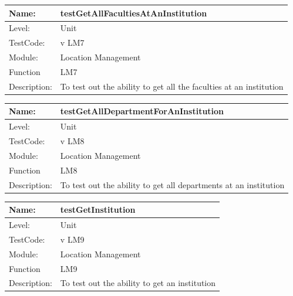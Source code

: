 \documentclass[12pt]{article}
\begin{document}
\begin{flushleft}
\begin{center}
\begin{tabular}{|l|p{12cm}|}
\hline

 Name: & testGetAllFacultiesAtAnInstitution \\
 \hline
Level: & Unit \\
\hline
TestCode: & v LM7 \\
\hline
Module:& Location Management \\
\hline
Function & LM7 \\
\hline
Description: & To test out the ability to get all the faculties at an institution  \\
\hline
\end{tabular}
\end{center}

\begin{center}
\begin{tabular}{|l|p{12cm}|}
\hline

 Name: & testGetAllDepartmentForAnInstitution \\
 \hline
Level: & Unit \\
\hline
TestCode: & v LM8 \\
\hline
Module:& Location Management \\
\hline
Function & LM8 \\
\hline
Description: & To test out the ability to get all departments at an institution  \\
\hline
\end{tabular}
\end{center}

\begin{center}
\begin{tabular}{|l|p{12cm}|}
\hline

 Name: & testGetInstitution \\
 \hline
Level: & Unit \\
\hline
TestCode: & v LM9 \\
\hline
Module:& Location Management \\
\hline
Function & LM9 \\
\hline
Description: & To test out the ability to get an institution  \\
\hline
\end{tabular}
\end{center}

\begin{center}
\begin{tabular}{|l|p{12cm}|}
\hline


\end{tabular}
\end{center}
\end{flushleft}
\end{document}
